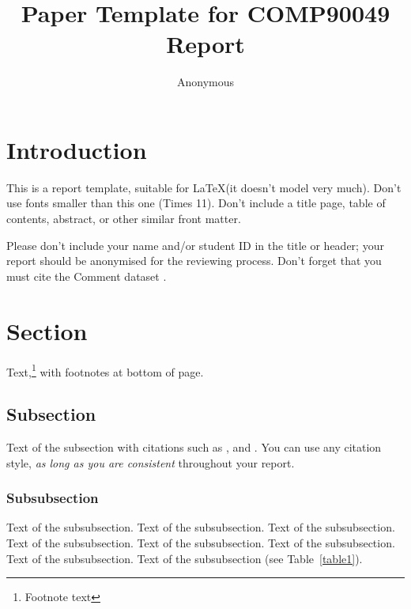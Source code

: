 \documentclass[11pt,twocolumn]{article}
\title{Paper Template for COMP90049 Report}
\author
{Anonymous}
\begin{document}
\maketitle



\section{Introduction}

This is a report template, suitable for \LaTeX (it doesn't model very much).
Don't use fonts smaller than this one (Times 11). Don't include a title page,
table of contents, abstract, or other similar front matter.

Please don't include your name and/or student ID in the title or header; 
your report should be anonymised for the reviewing process. Don't forget
that you must cite the Comment dataset \cite{dataset}.


\section{Section}

Text,\footnote{Footnote text} with footnotes at bottom of page.


\subsection{Subsection}

Text of the subsection with citations such as 
\cite{zaheri2020toxic}, \cite{van2018challenges} and \cite{ravi2019toxic}.
You can use any citation style, {\it as long as you are consistent} throughout your report.
\subsubsection{Subsubsection}

Text of the subsubsection.
Text of the subsubsection.
Text of the subsubsection.
Text of the subsubsection.
Text of the subsubsection.
Text of the subsubsection.
Text of the subsubsection.
Text of the subsubsection (see Table~\ref{table1}).
\end{document}
